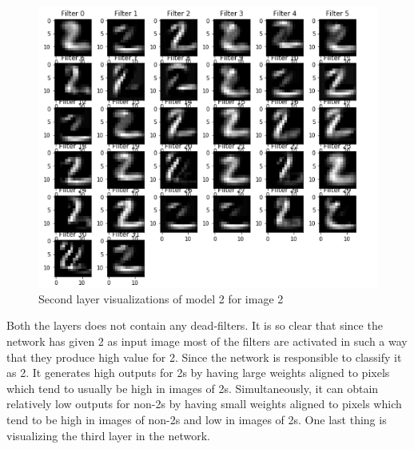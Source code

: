 \begin{figure}[h]
    \centering
    \includegraphics[width=1.0\textwidth]{thesis_template/images/22.png}
    \caption{\small Second layer visualizations of model 2 for image 2}
    \label{}
    \end{figure}
\newpage \noindent Both the layers does not contain any dead-filters. It is so clear that since the network has given 2 as input image most of the filters are activated in such a way that they produce high value for 2. Since the network is responsible to classify it as 2. It generates high outputs for 2s by having large weights aligned to pixels which tend to usually be high in images of 2s. Simultaneously, it can obtain relatively low outputs for non-2s by having small weights aligned to pixels which tend to be high in images of non-2s and low in images of 2s. One last thing is visualizing the third layer in the network.



